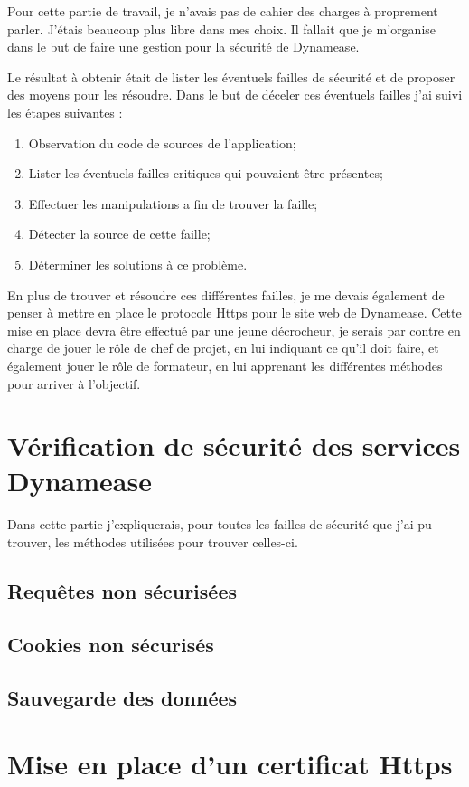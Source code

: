 Pour cette partie de travail, je n'avais pas de cahier des charges à proprement parler. J'étais beaucoup plus libre dans mes choix. Il fallait que je m'organise dans le but de faire une gestion pour la sécurité de Dynamease. 

Le résultat à obtenir était de lister les éventuels failles de sécurité et de proposer des moyens pour les résoudre. Dans le but de déceler ces éventuels failles j'ai suivi les étapes suivantes :

\begin{enumerate}
	\item Observation du code de sources de l'application;
	\item Lister les éventuels failles critiques qui pouvaient être présentes;
	\item Effectuer les manipulations a fin de trouver la faille;
	\item Détecter la source de cette faille;
	\item Déterminer les solutions à ce problème.
\end{enumerate} 

En plus de trouver et résoudre ces différentes failles, je me devais également de penser à mettre en place le protocole Https pour le site web de Dynamease. Cette mise en place devra être effectué par une jeune décrocheur, je serais par contre en charge de jouer le rôle de chef de projet, en lui indiquant ce qu'il doit faire, et également jouer le rôle de formateur, en lui apprenant les différentes méthodes pour arriver à l'objectif. 

\section{Vérification de sécurité des services Dynamease}

Dans cette partie j'expliquerais, pour toutes les failles de sécurité que j'ai pu trouver, les méthodes utilisées pour trouver celles-ci.

\subsection{Requêtes non sécurisées}

\subsection{Cookies non sécurisés}

\subsection{Sauvegarde des données}

\section{Mise en place d'un certificat Https}